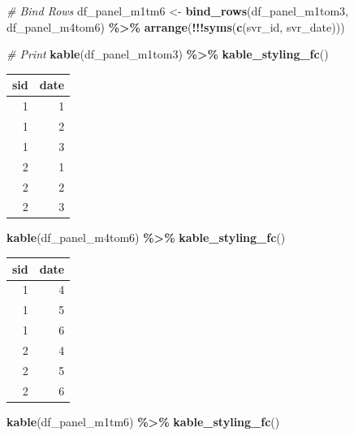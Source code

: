 \documentclass[
]{book}
\newenvironment{Shaded}{\begin{snugshade}}{\end{snugshade}}
\newcommand{\CommentTok}[1]{\textcolor[rgb]{0.56,0.35,0.01}{\textit{#1}}}
\newcommand{\KeywordTok}[1]{\textcolor[rgb]{0.13,0.29,0.53}{\textbf{#1}}}
\newcommand{\NormalTok}[1]{#1}
\newcommand{\OperatorTok}[1]{\textcolor[rgb]{0.81,0.36,0.00}{\textbf{#1}}}
\newcommand{\StringTok}[1]{\textcolor[rgb]{0.31,0.60,0.02}{#1}}
\begin{document}
\begin{Shaded}
\begin{Highlighting}[]
\CommentTok{\# Bind Rows}
\NormalTok{df\_panel\_m1tm6 \textless{}{-}}\StringTok{ }\KeywordTok{bind\_rows}\NormalTok{(df\_panel\_m1tom3, df\_panel\_m4tom6) }\OperatorTok{\%\textgreater{}\%}\StringTok{ }\KeywordTok{arrange}\NormalTok{(}\OperatorTok{!!!}\KeywordTok{syms}\NormalTok{(}\KeywordTok{c}\NormalTok{(svr\_id, svr\_date)))}

\CommentTok{\# Print}
\KeywordTok{kable}\NormalTok{(df\_panel\_m1tom3) }\OperatorTok{\%\textgreater{}\%}
\StringTok{  }\KeywordTok{kable\_styling\_fc}\NormalTok{()}
\end{Highlighting}
\end{Shaded}

\begin{table}[!h]
\centering
\begin{tabular}{r|r}
\hline
sid & date\\
\hline
\rowcolor{gray!6}  1 & 1\\
\hline
1 & 2\\
\hline
\rowcolor{gray!6}  1 & 3\\
\hline
2 & 1\\
\hline
\rowcolor{gray!6}  2 & 2\\
\hline
2 & 3\\
\hline
\end{tabular}
\end{table}

\begin{Shaded}
\begin{Highlighting}[]
\KeywordTok{kable}\NormalTok{(df\_panel\_m4tom6) }\OperatorTok{\%\textgreater{}\%}
\StringTok{  }\KeywordTok{kable\_styling\_fc}\NormalTok{()}
\end{Highlighting}
\end{Shaded}

\begin{table}[!h]
\centering
\begin{tabular}{r|r}
\hline
sid & date\\
\hline
\rowcolor{gray!6}  1 & 4\\
\hline
1 & 5\\
\hline
\rowcolor{gray!6}  1 & 6\\
\hline
2 & 4\\
\hline
\rowcolor{gray!6}  2 & 5\\
\hline
2 & 6\\
\hline
\end{tabular}
\end{table}

\begin{Shaded}
\begin{Highlighting}[]
\KeywordTok{kable}\NormalTok{(df\_panel\_m1tm6) }\OperatorTok{\%\textgreater{}\%}
\StringTok{  }\KeywordTok{kable\_styling\_fc}\NormalTok{()}
\end{Highlighting}
\end{Shaded}
\end{document}
